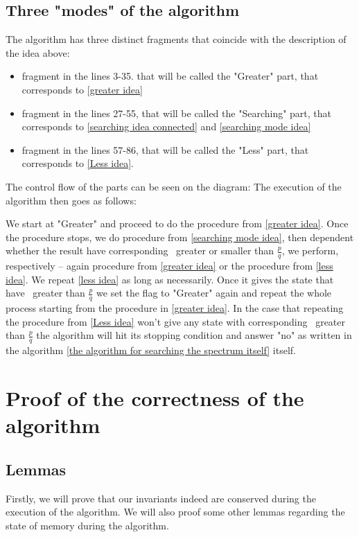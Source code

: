 \subsection{Three "modes" of the algorithm}
The algorithm has three distinct fragments that coincide with 
the description of the idea above: 
\begin{itemize}
\item fragment in the lines 3-35. that will be called the "Greater" part, 
that corresponds to \ref{greater idea}
\item fragment in the lines 27-55, that will be called the "Searching" part, 
that corresponds to \ref{searching idea connected} and \ref{searching mode idea}
\item fragment in the lines 57-86, that will be called the "Less" part, that 
corresponds to \ref{Less idea}.
\end{itemize}

The control flow of the parts can be seen on the diagram:
The execution of the algorithm then goes as follows:

We start at "Greater" and proceed to do the procedure from \ref{greater idea}. 
Once the procedure stops, we do procedure from \ref{searching mode idea}, then 
dependent whether the result have corresponding \Eoc\ greater or smaller than $\frac{p}{q}$, 
we perform, respectively -- again procedure from \ref{greater idea} or the 
procedure from \ref{less idea}. We repeat \ref{less idea} as long as necessarily. 
Once it gives the state that have \Eoc\ greater than $\frac{p}{q}$ we set the flag to 
"Greater" again and repeat the whole process starting from the procedure in \ref{greater idea}. 
In the case that repeating the procedure from \ref{Less idea} won't give any state with 
corresponding \Eoc\ greater than $\frac{p}{q}$ the algorithm will hit its stopping condition 
and answer "no" as written in the algorithm 
\ref{the algorithm for searching the spectrum itself} itself.   
\section{Proof of the correctness of the algorithm}\label{memory state proof}
\subsection{Lemmas}\label{lemmas for the proof of the correctness}
Firstly, we will prove that our invariants indeed are conserved during the execution 
of the algorithm. We will also proof some other lemmas regarding the state of memory 
during the algorithm.

